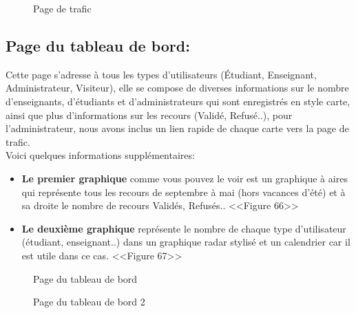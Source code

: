 \documentclass[12pt]{report}
\begin{document}
\begin{figure}[h]
\centering
  \hspace*{-0.33in}
\caption{Page de trafic}
\end{figure}

\newpage

\subsection{Page du tableau de bord:}

Cette page s'adresse à tous les types d'utilisateurs (Étudiant, Enseignant, Administrateur, Visiteur), elle se compose de diverses informations sur le nombre d'enseignants, d'étudiants et d'administrateurs qui sont enregistrés en style carte, ainsi que plus d'informations sur les recours (Validé, Refusé..), pour l'administrateur, nous avons inclus un lien rapide de chaque carte vers la page de trafic.
\\
Voici quelques informations supplémentaires:

\begin{itemize}
  \item \textbf{Le premier graphique} comme vous pouvez le voir est un graphique à aires qui représente tous les recours de septembre à mai (hors vacances d'été) et à sa droite le nombre de recours Validés, Refusés.. <<Figure 66>>
  \item \textbf{Le deuxième graphique} représente le nombre de chaque type d'utilisateur (étudiant, enseignant..) dans un graphique radar stylisé et un calendrier car il est utile dans ce cas. <<Figure 67>>
\end{itemize}

\vspace{0.2in}

\begin{figure}[h]
\centering
  \hspace*{-0.33in}
\caption{Page du tableau de bord}
\end{figure}

\newpage

\begin{figure}[h]
\centering
  \hspace*{-0.33in}
\caption{Page du tableau de bord 2}
\end{figure}
\end{document}
